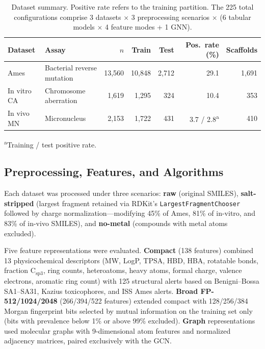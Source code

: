 \begin{table}[ht]
\caption{Dataset summary. Positive rate refers to the training partition. The 225 total 
configurations comprise 3 datasets $\times$ 3 preprocessing scenarios $\times$ (6 tabular 
models $\times$ 4 feature modes + 1 GNN).}
\label{tab:datasets}
\centering
\small
\begin{tabular}{@{}llrrrrr@{}}
\toprule
Dataset & Assay & $n$ & Train & Test & Pos.\ rate (\%) & Scaffolds \\
\midrule
Ames       & Bacterial reverse mutation & 13,560 & 10,848 & 2,712 & 29.1             & 1,691 \\
In vitro CA & Chromosome aberration     &  1,619 &  1,295 &   324 & 10.4             &   353 \\
In vivo MN  & Micronucleus              &  2,153 &  1,722 &   431 & 3.7 / 2.8\textsuperscript{a} & 410 \\
\bottomrule
\end{tabular}

\medskip
\footnotesize
\textsuperscript{a}Training / test positive rate.
\end{table}

\subsection{Preprocessing, Features, and Algorithms}

Each dataset was processed under three scenarios: \textbf{raw} (original SMILES), 
\textbf{salt-stripped} (largest fragment retained via RDKit's 
\texttt{LargestFragmentChooser}\cite{RDKit} followed by charge normalization---modifying 
45\% of Ames, 81\% of in-vitro, and 83\% of in-vivo SMILES), and \textbf{no-metal} 
(compounds with metal atoms excluded).

Five feature representations were evaluated. \textbf{Compact} (138 features) combined 13 
physicochemical descriptors (MW, LogP, TPSA, HBD, HBA, rotatable bonds, fraction 
$\mathrm{C_{sp3}}$, ring counts, heteroatoms, heavy atoms, formal charge, valence electrons, 
aromatic ring count) with 125 structural alerts based on Benigni--Bossa 
SA1--SA31,\cite{Benigni_Bossa_2008,Benigni_2013} Kazius toxicophores,\cite{Kazius_2005} and 
ISS Ames alerts. \textbf{Broad FP-512/1024/2048} (266/394/522 features) extended compact 
with 128/256/384 Morgan fingerprint bits\cite{Rogers_Hahn_2010} selected by mutual 
information\cite{Kraskov_2004} on the training set only (bits with prevalence below 1\% or 
above 99\% excluded). \textbf{Graph} representations used molecular graphs with 9-dimensional 
atom features and normalized adjacency matrices, paired exclusively with the GCN.

